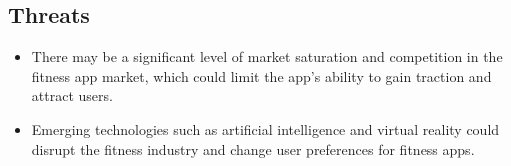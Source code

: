 \subsection{Threats}
\begin{itemize}
  \item There may be a significant level of market saturation and competition in the fitness app market, which could limit the app's ability to gain traction and attract users.
  \item Emerging technologies such as artificial intelligence and virtual reality could disrupt the fitness industry and change user preferences for fitness apps.
\end{itemize}

\clearpage